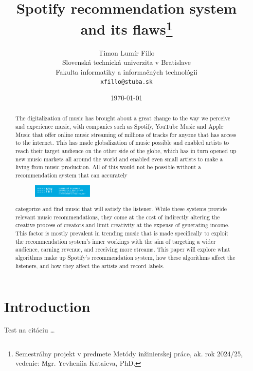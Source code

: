 \documentclass[10pt,twocolumn,twoside,slovak,a4paper]{article}
\title{Spotify recommendation system and its flaws\thanks{Semestrálny projekt v predmete Metódy inžinierskej práce, ak. rok 2024/25, vedenie: Mgr. Yevheniia Kataieva, PhD.}} %
\author{Timon Lumír Fillo\\[2pt]
	{\small Slovenská technická univerzita v Bratislave}\\
	{\small Fakulta informatiky a informačných technológií}\\
	{\small \texttt{xfillo@stuba.sk}}
	}
\date{\small \today} %
\begin{document}
\maketitle

\begin{abstract}

The digitalization of music has brought about a great change to the way we perceive and experience music, with companies such as Spotify, YouTube Music and Apple Music that offer online music streaming of millions of tracks for anyone that has access to the internet. This has made globalization of music possible and enabled artists to reach their target audience on the other side of the globe, which has in turn opened up new music markets all around the world and enabled even small artists to make a living from music production. All of this would not be possible without a recommendation system that can accurately
\begin{figure}
\centering
\includegraphics[width=0.3\textwidth]{fiitLogo/PNG/STU-FIIT-nfnh.png}
\end{figure} 
categorize and find music that will satisfy the listener. While these systems provide relevant music recommendations, they come at the cost of indirectly altering the creative process of creators and limit creativity at the expense of generating income. This factor is mostly prevalent in trending music that is made specifically to exploit the recommendation system's inner workings with the aim of targeting a wider audience, earning revenue, and receiving more streams. This paper will explore what algorithms make up Spotify's recommendation system, how these algorithms affect the listeners, and how they affect the artists and record labels.

\end{abstract}



\section{Introduction}
Test na citáciu
\cite{hodgson2021spotify}
\dots
\end{document}
